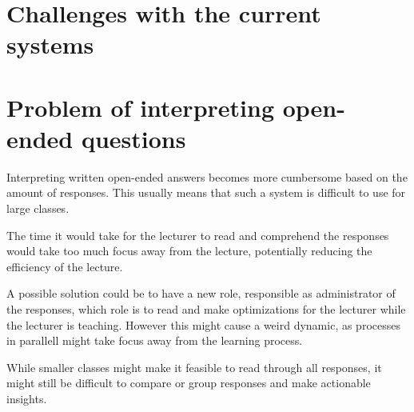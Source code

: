
\section{Challenges with the current systems}


\section{Problem of interpreting open-ended questions}
Interpreting written open-ended answers becomes more cumbersome based on the amount of responses. This usually means that such a system is difficult to use for large classes. 

The time it would take for the lecturer to read and comprehend the responses would take too much focus away from the lecture, potentially reducing the efficiency of the lecture. 

A possible solution could be to have a new role, responsible as administrator of the responses, which role is to read and make optimizations for the lecturer while the lecturer is teaching. However this might cause a weird dynamic, as processes in parallell might take focus away from the learning process.

While smaller classes might make it feasible to read through all responses, it might still be difficult to compare or group responses and make actionable insights. 

